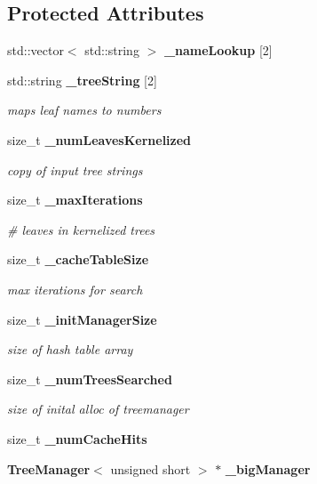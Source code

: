 \subsection*{Protected Attributes}
\begin{CompactItemize}
\item 
std::vector$<$ std::string $>$ {\bf \_\-name\-Lookup} [2]
\item 
std::string {\bf \_\-tree\-String} [2]
\begin{CompactList}\small\item\em maps leaf names to numbers \item\end{CompactList}\item 
size\_\-t {\bf \_\-num\-Leaves\-Kernelized}
\begin{CompactList}\small\item\em copy of input tree strings \item\end{CompactList}\item 
size\_\-t {\bf \_\-max\-Iterations}
\begin{CompactList}\small\item\em \# leaves in kernelized trees \item\end{CompactList}\item 
size\_\-t {\bf \_\-cache\-Table\-Size}
\begin{CompactList}\small\item\em max iterations for search \item\end{CompactList}\item 
size\_\-t {\bf \_\-init\-Manager\-Size}
\begin{CompactList}\small\item\em size of hash table array \item\end{CompactList}\item 
size\_\-t {\bf \_\-num\-Trees\-Searched}
\begin{CompactList}\small\item\em size of inital alloc of treemanager \item\end{CompactList}\item 
size\_\-t {\bf \_\-num\-Cache\-Hits}
\item 
{\bf Tree\-Manager}$<$ unsigned short $>$ $\ast$ {\bf \_\-big\-Manager}
\item 

\end{CompactItemize}
